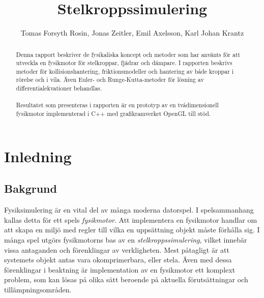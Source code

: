 \documentclass[a4paper,12pt,twopage,swedish]{article}
\begin{document}
\title{Stelkroppssimulering}
\author{Tomas Forsyth Rosin, Jonas Zeitler, Emil Axelsson, Karl Johan Krantz}
\begin{titlepage}
\maketitle
\thispagestyle{empty}
\end{titlepage}
\setcounter{page}{1}
\begin{abstract}
\noindent Denna rapport beskriver de fysikaliska koncept och metoder som har använts för att utveckla en fysikmotor för stelkroppar, fjädrar och dämpare. I rapporten beskrivs metoder för kollisionshantering,  friktionsmodeller och hantering av både kroppar i rörelse och i vila. Även Euler- och Runge-Kutta-metoder för lösning av differentialekvationer behandlas. 
\\
\\Resultatet som presenteras i rapporten är en prototyp av en tvådimensionell fysikmotor implementerad i C++ med grafikramverket OpenGL till stöd.
\end{abstract}
\clearpage
\tableofcontents
\clearpage
\listoffigures
\clearpage
\setcounter{page}{1}

\section{Inledning}

\subsection{Bakgrund}
Fysiksimulering är en vital del av många moderna datorspel. I spelsammanhang kallas detta för ett spels \emph{fysikmotor}. Att implementera en fysikmotor handlar om att skapa en miljö med regler till vilka en uppsättning objekt måste förhålla sig. I många spel utgörs fysikmotorns bas av en \emph{stelkroppssimulering}, vilket innebär vissa antaganden och förenklingar av verkligheten. Mest påtagligt är att systemets objekt antas vara okomprimerbara, eller stela. Även med dessa förenklingar i beaktning är implementation av en fysikmotor ett komplext problem, som kan lösas på olika sätt beroende på aktuella förutsättningar och tillämpningsområden.
\end{document}
